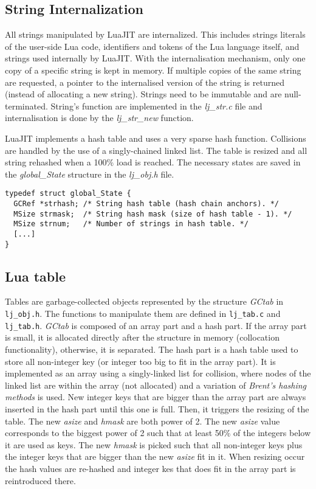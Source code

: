\subsection{String Internalization}
\label{Subsec:string-inter}

All strings manipulated by LuaJIT are internalized. This includes strings literals of the user-side Lua code, identifiers and tokens of the Lua language itself, and strings used internally by LuaJIT. With the internalisation mechanism, only one copy of a specific string is kept in memory. If multiple copies of the same string are requested, a pointer to the internalised version of the string is returned (instead of allocating a new string). Strings need to be immutable and are null-terminated. String's function are implemented in the \emph{lj\_str.c} file and internalisation is done by the \emph{lj\_str\_new} function.

LuaJIT implements a hash table and uses a very sparse hash function. Collisions are handled by the use of a singly-chained linked list. The table is resized and all string rehashed when a 100\% load is reached. The necessary states are saved in the \emph{global\_State} structure in the \emph{lj\_obj.h} file.

\begin{lstlisting}[style=CStyle]
typedef struct global_State {
  GCRef *strhash; /* String hash table (hash chain anchors). */
  MSize strmask;  /* String hash mask (size of hash table - 1). */
  MSize strnum;   /* Number of strings in hash table. */
  [...]
}
\end{lstlisting}

\subsection{Lua table}
\label{Subsec:table}

Tables are garbage-collected objects represented by the structure \emph{GCtab} in \texttt{lj\_obj.h}. The functions to manipulate them are defined in \texttt{lj\_tab.c} and \texttt{lj\_tab.h}. \emph{GCtab} is composed of an array part and a hash part. If the array part is small, it is allocated directly after the structure in memory (collocation functionality), otherwise, it is separated. The hash part is a hash table used to store all non-integer key (or integer too big to fit in the array part). It is implemented as an array using a singly-linked list for collision, where nodes of the linked list are within the array (not allocated) and a variation of \emph{Brent's hashing methods} is used. New integer keys that are bigger than the array part are always inserted in the hash part until this one is full. Then, it triggers the resizing of the table. The new \emph{asize} and \emph{hmask} are both power of 2. The new \emph{asize} value corresponds to the biggest power of 2 such that at least 50\% of the integers below it are used as keys. The new \emph{hmask} is picked such that all non-integer keys plus the integer keys that are bigger than the new \emph{asize} fit in it. When resizing occur the hash values are re-hashed and integer kes that does fit in the array part is reintroduced there.

